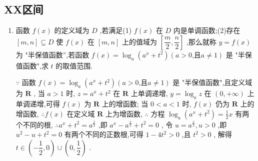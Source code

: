\subsection*{XX区间}
\begin{enumerate}
    \item 函数 $f\left( x\right)$ 的定义域为 $D$ ,若满足(1) $f\left( x\right)$ 在 $D$ 内是单调函数;(2)存在$\left\lbrack  {m,n}\right\rbrack   \subseteq  D$ 使 $f\left( x\right)$ 在 $\left\lbrack  {m,n}\right\rbrack$ 上的值域为 $\left\lbrack  {\dfrac{m}{2},\dfrac{n}{2}}\right\rbrack$ ,那么就称 $y = f\left( x\right)$ 为 "半保值函数”,若函数 $f\left( x\right)  = {\log }_{a}\left( {{a}^{x} + {t}^{2}}\right) \left( {a > 0\text{,且}a \neq  1}\right)$ 是 "半保值函数",求 $t$ 的取值范围.
    \begin{jieda}
        $\because$ 函数 $f\left( x\right)  = {\log }_{a}\left( {{a}^{x} + {t}^{2}}\right) \left( {a > 0\text{,且}a \neq  1}\right)$ 是 "半保值函数",且定义域为 $\mathbf{R}$ ,
        当 $a > 1$ 时, $z = {a}^{x} + {t}^{2}$ 在 $\mathbf{R}$ 上单调递增, $y = {\log }_{a}z$ 在 $\left( {0, + \infty }\right)$ 上单调递增,可得
        $f\left( x\right)$ 为 $\mathbf{R}$ 上的增函数;
        当 $0 < a < 1$ 时, $f\left( x\right)$ 仍为 $\mathbf{R}$ 上的增函数, $\therefore f\left( x\right)$ 在定义域 $\mathbf{R}$ 上为增函数,
        $\therefore$ 方程 ${\log }_{a}\left( {{a}^{x} + {t}^{2}}\right)  = \frac{1}{2}x$ 有两个不同的根, $\therefore {a}^{x} + {t}^{2} = {a}^{\frac{x}{2}}$ ,即 ${a}^{x} - {a}^{\frac{x}{2}} + {t}^{2} = 0$ ,
        令 $u = {a}^{\frac{x}{2}},u > 0$ ,即 ${u}^{2} - u + {t}^{2} = 0$ 有两个不同的正数根,可得 $1 - 4{t}^{2} > 0$ ,且 ${t}^{2} > 0$ ,
        解得 $t \in  \left( {-\dfrac{1}{2},0}\right)  \cup  \left( {0,\dfrac{1}{2}}\right)$ .
    \end{jieda}


\end{enumerate}
